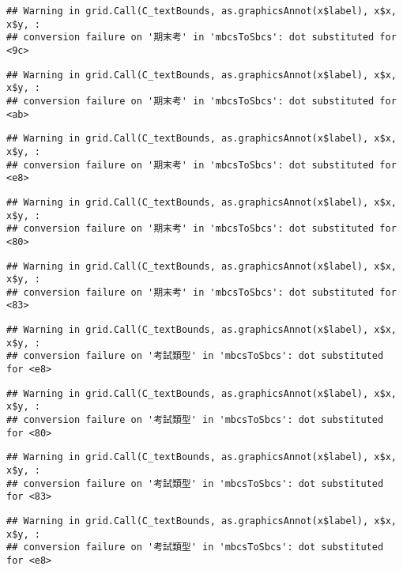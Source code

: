 \documentclass[
]{book}
\begin{document}
\begin{verbatim}
## Warning in grid.Call(C_textBounds, as.graphicsAnnot(x$label), x$x, x$y, :
## conversion failure on '期末考' in 'mbcsToSbcs': dot substituted for <9c>
\end{verbatim}

\begin{verbatim}
## Warning in grid.Call(C_textBounds, as.graphicsAnnot(x$label), x$x, x$y, :
## conversion failure on '期末考' in 'mbcsToSbcs': dot substituted for <ab>
\end{verbatim}

\begin{verbatim}
## Warning in grid.Call(C_textBounds, as.graphicsAnnot(x$label), x$x, x$y, :
## conversion failure on '期末考' in 'mbcsToSbcs': dot substituted for <e8>
\end{verbatim}

\begin{verbatim}
## Warning in grid.Call(C_textBounds, as.graphicsAnnot(x$label), x$x, x$y, :
## conversion failure on '期末考' in 'mbcsToSbcs': dot substituted for <80>
\end{verbatim}

\begin{verbatim}
## Warning in grid.Call(C_textBounds, as.graphicsAnnot(x$label), x$x, x$y, :
## conversion failure on '期末考' in 'mbcsToSbcs': dot substituted for <83>
\end{verbatim}

\begin{verbatim}
## Warning in grid.Call(C_textBounds, as.graphicsAnnot(x$label), x$x, x$y, :
## conversion failure on '考試類型' in 'mbcsToSbcs': dot substituted for <e8>
\end{verbatim}

\begin{verbatim}
## Warning in grid.Call(C_textBounds, as.graphicsAnnot(x$label), x$x, x$y, :
## conversion failure on '考試類型' in 'mbcsToSbcs': dot substituted for <80>
\end{verbatim}

\begin{verbatim}
## Warning in grid.Call(C_textBounds, as.graphicsAnnot(x$label), x$x, x$y, :
## conversion failure on '考試類型' in 'mbcsToSbcs': dot substituted for <83>
\end{verbatim}

\begin{verbatim}
## Warning in grid.Call(C_textBounds, as.graphicsAnnot(x$label), x$x, x$y, :
## conversion failure on '考試類型' in 'mbcsToSbcs': dot substituted for <e8>
\end{verbatim}
\end{document}
